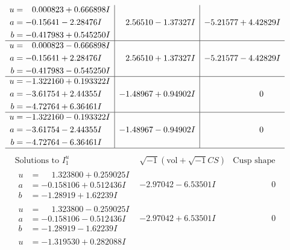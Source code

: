 \documentclass[1p]{elsarticle_modified}
\theoremstyle{definition}
\newcommand{\I}{\sqrt{-1}}
\begin{document}
$$\begin{array}{c|c|c}
\begin{aligned}
u &= \phantom{-}0.000823 + 0.666898 I \\
a &= -0.15641 - 2.28476 I \\
b &= -0.417983 + 0.545250 I\end{aligned}
 & \phantom{-}2.56510 - 1.37327 I & -5.21577 + 4.42829 I \\ \hline\begin{aligned}
u &= \phantom{-}0.000823 - 0.666898 I \\
a &= -0.15641 + 2.28476 I \\
b &= -0.417983 - 0.545250 I\end{aligned}
 & \phantom{-}2.56510 + 1.37327 I & -5.21577 - 4.42829 I \\ \hline\begin{aligned}
u &= -1.322160 + 0.193322 I \\
a &= -3.61754 + 2.44355 I \\
b &= -4.72764 + 6.36461 I\end{aligned}
 & -1.48967 + 0.94902 I & \phantom{-0.000000 } 0 \\ \hline\begin{aligned}
u &= -1.322160 - 0.193322 I \\
a &= -3.61754 - 2.44355 I \\
b &= -4.72764 - 6.36461 I\end{aligned}
 & -1.48967 - 0.94902 I & \phantom{-0.000000 } 0\\
 \hline 
 \end{array}$$\newpage$$\begin{array}{c|c|c}  
\text{Solutions to }I^u_{1}& \I (\text{vol} + \sqrt{-1}CS) & \text{Cusp shape}\\
 \hline 
\begin{aligned}
u &= \phantom{-}1.323800 + 0.259025 I \\
a &= -0.158106 + 0.512436 I \\
b &= -1.28919 + 1.62239 I\end{aligned}
 & -2.97042 - 6.53501 I & \phantom{-0.000000 } 0 \\ \hline\begin{aligned}
u &= \phantom{-}1.323800 - 0.259025 I \\
a &= -0.158106 - 0.512436 I \\
b &= -1.28919 - 1.62239 I\end{aligned}
 & -2.97042 + 6.53501 I & \phantom{-0.000000 } 0 \\ \hline\begin{aligned}
u &= -1.319530 + 0.282088 I \\

\end{aligned}
\end{array}$$
\end{document}
